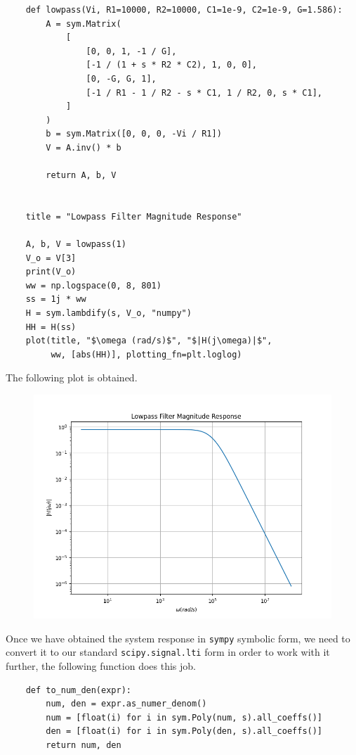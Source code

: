 \documentclass[12pt, a4paper]{article}
\newcommand{\code}{\lstinline[basicstyle=\small]}
\begin{document}
\begin{lstlisting}
    def lowpass(Vi, R1=10000, R2=10000, C1=1e-9, C2=1e-9, G=1.586):
        A = sym.Matrix(
            [
                [0, 0, 1, -1 / G],
                [-1 / (1 + s * R2 * C2), 1, 0, 0],
                [0, -G, G, 1],
                [-1 / R1 - 1 / R2 - s * C1, 1 / R2, 0, s * C1],
            ]
        )
        b = sym.Matrix([0, 0, 0, -Vi / R1])
        V = A.inv() * b

        return A, b, V

        
    title = "Lowpass Filter Magnitude Response"

    A, b, V = lowpass(1)
    V_o = V[3]
    print(V_o)
    ww = np.logspace(0, 8, 801)
    ss = 1j * ww
    H = sym.lambdify(s, V_o, "numpy")
    HH = H(ss)
    plot(title, "$\omega (rad/s)$", "$|H(j\omega)|$",
         ww, [abs(HH)], plotting_fn=plt.loglog)
\end{lstlisting}
The following plot is obtained.

\begin{figure}[H]
    \centering
    \includegraphics[scale=0.6]{0.png}
\end{figure}

Once we have obtained the system response in \code{sympy} symbolic form, we need to convert it to our standard
\code{scipy.signal.lti} form in order to work with it further, the following function does this job.

\begin{lstlisting}
    def to_num_den(expr):
        num, den = expr.as_numer_denom()
        num = [float(i) for i in sym.Poly(num, s).all_coeffs()]
        den = [float(i) for i in sym.Poly(den, s).all_coeffs()]
        return num, den
\end{lstlisting}
\end{document}

